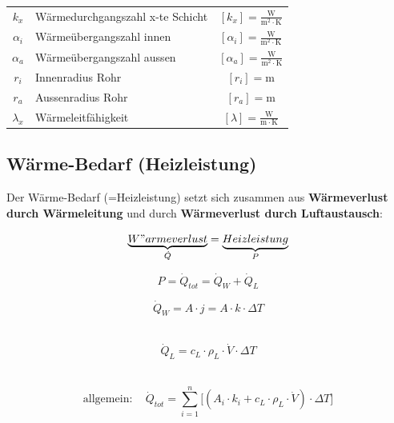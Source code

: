 \begin{tabular}{c l c}
	\rule{0pt}{10pt}$k_x$ & Wärmedurchgangszahl x-te Schicht & $[k_x] = \mathrm{\frac{W}{m^2 \cdot K}}$ \\
	\rule{0pt}{10pt}$\alpha_i$ & Wärmeübergangszahl innen & $[\alpha_i] = \mathrm{\frac{W}{m^2 \cdot K}} $\\
	\rule{0pt}{10pt}$\alpha_a$ & Wärmeübergangszahl aussen & $[\alpha_a] = \mathrm{\frac{W}{m^2 \cdot K}} $\\
	$r_i$ & Innenradius Rohr & $[r_i] = \mathrm{m}$	 \\
	$r_a$ & Aussenradius Rohr & $[r_a] = \mathrm{m}$	 \\
	\rule{0pt}{10pt}$\lambda_x$ & Wärmeleitfähigkeit & $[\lambda] = \mathrm{\frac{W}{m \cdot K}} $\\
\end{tabular}





\subsection{Wärme-Bedarf (Heizleistung)}\label{Wärmeleistung}
Der Wärme-Bedarf (=Heizleistung) setzt sich zusammen aus \textbf{Wärmeverlust durch Wärmeleitung} und durch \textbf{Wärmeverlust durch Luftaustausch}: 

$$\mathrm{\underbrace{W"armeverlust}_{\substack{\dot{Q}}}  = \underbrace{Heizleistung}_{\substack{P}}  }   $$

$$ \boxed{ P = \dot{Q}_{tot} = \dot{Q}_W + \dot{Q}_L }   $$

\begin{minipage}{0.46\linewidth}
$$ \boxed{ \dot{Q}_W = A \cdot j = A \cdot k \cdot \Delta T  }$$ \\
\end{minipage}
\hfill
\begin{minipage}{0.46\linewidth}
$$ \boxed{ \dot{Q}_L = c_L \cdot \rho_L \cdot \dot{V} \cdot \Delta T}   $$
\\
\end{minipage}



$$ \boxed{ \mathrm{allgemein: } \quad \dot{Q}_{tot} = \sum_{i=1}^n  \big[  (A_i \cdot k_i + c_L \cdot \rho_L \cdot \dot{V} ) \cdot \Delta T \big]  }   $$


